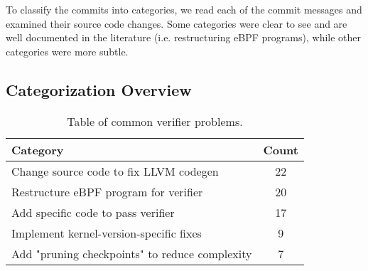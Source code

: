 
To classify the commits into categories, we read each of the commit messages and examined
    their source code changes.
Some categories were clear to see and are well documented in the literature (i.e. restructuring eBPF programs), while other categories were more subtle.


\subsection{Categorization Overview}

\begin{table}[t]
    \small
    \centering
    \begin{tabular}{lc}%
        \toprule
        \textbf{Category} & \textbf{Count} \\
        \midrule
        Change source code to fix LLVM codegen & 22 \\          %
        Restructure eBPF program for verifier & 20 \\           %
        Add specific code to pass verifier & 17 \\              %
        Implement kernel-version-specific fixes & 9 \\          %
        Add "pruning checkpoints" to reduce complexity & 7 \\   %
        \bottomrule
    \end{tabular}
    \caption{Table of common verifier problems. }
    \label{fig:commit-table}
\end{table}


